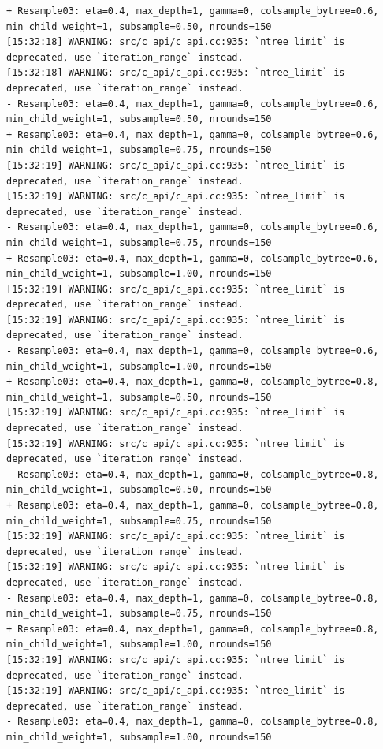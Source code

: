 \documentclass[
  letterpaper,
  DIV=11,
  numbers=noendperiod]{scrartcl}
\begin{document}
\begin{verbatim}
+ Resample03: eta=0.4, max_depth=1, gamma=0, colsample_bytree=0.6, min_child_weight=1, subsample=0.50, nrounds=150 
[15:32:18] WARNING: src/c_api/c_api.cc:935: `ntree_limit` is deprecated, use `iteration_range` instead.
[15:32:18] WARNING: src/c_api/c_api.cc:935: `ntree_limit` is deprecated, use `iteration_range` instead.
- Resample03: eta=0.4, max_depth=1, gamma=0, colsample_bytree=0.6, min_child_weight=1, subsample=0.50, nrounds=150 
+ Resample03: eta=0.4, max_depth=1, gamma=0, colsample_bytree=0.6, min_child_weight=1, subsample=0.75, nrounds=150 
[15:32:19] WARNING: src/c_api/c_api.cc:935: `ntree_limit` is deprecated, use `iteration_range` instead.
[15:32:19] WARNING: src/c_api/c_api.cc:935: `ntree_limit` is deprecated, use `iteration_range` instead.
- Resample03: eta=0.4, max_depth=1, gamma=0, colsample_bytree=0.6, min_child_weight=1, subsample=0.75, nrounds=150 
+ Resample03: eta=0.4, max_depth=1, gamma=0, colsample_bytree=0.6, min_child_weight=1, subsample=1.00, nrounds=150 
[15:32:19] WARNING: src/c_api/c_api.cc:935: `ntree_limit` is deprecated, use `iteration_range` instead.
[15:32:19] WARNING: src/c_api/c_api.cc:935: `ntree_limit` is deprecated, use `iteration_range` instead.
- Resample03: eta=0.4, max_depth=1, gamma=0, colsample_bytree=0.6, min_child_weight=1, subsample=1.00, nrounds=150 
+ Resample03: eta=0.4, max_depth=1, gamma=0, colsample_bytree=0.8, min_child_weight=1, subsample=0.50, nrounds=150 
[15:32:19] WARNING: src/c_api/c_api.cc:935: `ntree_limit` is deprecated, use `iteration_range` instead.
[15:32:19] WARNING: src/c_api/c_api.cc:935: `ntree_limit` is deprecated, use `iteration_range` instead.
- Resample03: eta=0.4, max_depth=1, gamma=0, colsample_bytree=0.8, min_child_weight=1, subsample=0.50, nrounds=150 
+ Resample03: eta=0.4, max_depth=1, gamma=0, colsample_bytree=0.8, min_child_weight=1, subsample=0.75, nrounds=150 
[15:32:19] WARNING: src/c_api/c_api.cc:935: `ntree_limit` is deprecated, use `iteration_range` instead.
[15:32:19] WARNING: src/c_api/c_api.cc:935: `ntree_limit` is deprecated, use `iteration_range` instead.
- Resample03: eta=0.4, max_depth=1, gamma=0, colsample_bytree=0.8, min_child_weight=1, subsample=0.75, nrounds=150 
+ Resample03: eta=0.4, max_depth=1, gamma=0, colsample_bytree=0.8, min_child_weight=1, subsample=1.00, nrounds=150 
[15:32:19] WARNING: src/c_api/c_api.cc:935: `ntree_limit` is deprecated, use `iteration_range` instead.
[15:32:19] WARNING: src/c_api/c_api.cc:935: `ntree_limit` is deprecated, use `iteration_range` instead.
- Resample03: eta=0.4, max_depth=1, gamma=0, colsample_bytree=0.8, min_child_weight=1, subsample=1.00, nrounds=150 

\end{verbatim}
\end{document}
